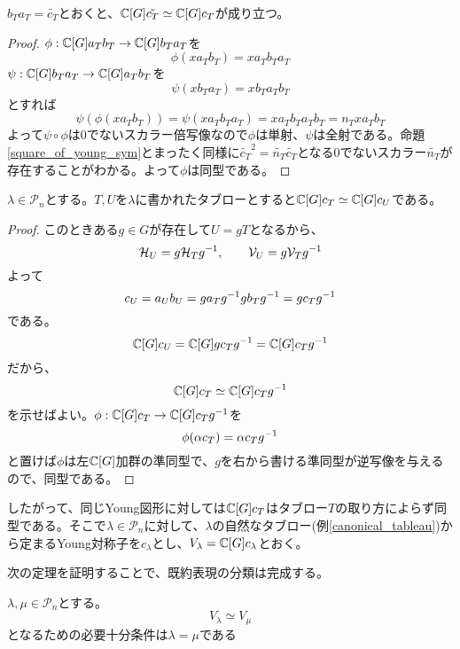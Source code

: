 \documentclass{ltjsarticle}
\begin{document}
\begin{prop}\label{reverse_young_sym}
  $b_T a_T=\tilde{c_T}$とおくと、$\mathbb{C}[G]\tilde{c_T}\simeq \mathbb{C}[G]c_T$が成り立つ。
\end{prop}

\begin{proof}
  $\phi:\mathbb{C}[G]a_Tb_T\rightarrow\mathbb{C}[G]b_Ta_T$を
  \[
  \phi(xa_Tb_T)=xa_Tb_Ta_T  
  \]
  $\psi:\mathbb{C}[G]b_Ta_T\rightarrow\mathbb{C}[G]a_Tb_T$を
  \[
  \psi(xb_Ta_T)=xb_Ta_Tb_T  
  \]
  とすれば
  \[
  \psi(\phi(xa_Tb_T))=\psi(xa_Tb_Ta_T)=xa_Tb_Ta_Tb_T=n_Txa_Tb_T  
  \]
  よって$\psi\circ\phi$は0でないスカラー倍写像なので$\phi$は単射、$\psi$は全射である。命題\ref{square_of_young_sym}とまったく同様に$\tilde{c_T}^2=\tilde{n_T}\tilde{c_T}$となる0でないスカラー$\tilde{n_T}$が存在することがわかる。よって$\phi$は同型である。
\end{proof}


\begin{prop}
  $\lambda\in\mathcal{P}_n$とする。$T,U$を$\lambda$に書かれたタブローとすると$\mathbb{C}[G]c_T\simeq \mathbb{C}[G]c_U$である。
\end{prop}

\begin{proof}
  このときある$g\in G$が存在して$U=gT$となるから、
  \[
  \mathcal{H}_U=g\mathcal{H}_Tg^{-1},\qquad \mathcal{V}_U=g\mathcal{V}_Tg^{-1}  
  \]
  よって
  \[
  c_U=a_Ub_U=ga_Tg^{-1}gb_Tg^{-1}=gc_Tg^{-1}  
  \]
  である。
  \[
  \mathbb{C}[G]c_U=\mathbb{C}[G]gc_Tg^{-1}=\mathbb{C}[G]c_Tg^{-1}  
  \]
  だから、
  \[
  \mathbb{C}[G]c_T\simeq \mathbb{C}[G]c_Tg^{-1}  
  \]
  を示せばよい。$\phi:\mathbb{C}[G]c_T\rightarrow\mathbb{C}[G]c_Tg^{-1}$を
  \[
  \phi(\alpha c_T)=\alpha c_Tg^{-1}  
  \]
  と置けば$\phi$は左$\mathbb{C}[G]$加群の準同型で、$g$を右から書ける準同型が逆写像を与えるので、同型である。
\end{proof}


したがって、同じYoung図形に対しては$\mathbb{C}[G]c_T$はタブロー$T$の取り方によらず同型である。そこで$\lambda\in\mathcal{P}_n$に対して、$\lambda$の自然なタブロー(例\ref{canonical_tableau})から定まるYoung対称子を$c_\lambda$とし、$V_\lambda=\mathbb{C}[G]c_\lambda$とおく。





次の定理を証明することで、既約表現の分類は完成する。

\begin{theo}\label{young_and_irr_rep}
  $\lambda,\mu\in\mathcal{P}_n$とする。
  \[
  V_\lambda\simeq V_\mu 
  \]
  となるための必要十分条件は$\lambda=\mu$である
\end{theo}
\end{document}
